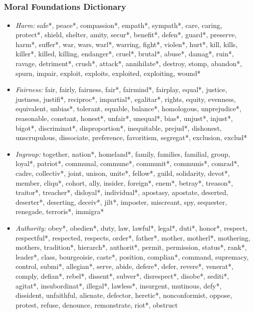 \documentclass{beamer}
\begin{document}
\subsection{}
\begin{frame}%
  \frametitle{Moral Foundations Dictionary \citep[c.f.][]{graham2009liberals}}
  \begin{tiny}
    \begin{itemize}
      \item \emph{Harm:} safe*, peace*, compassion*, empath*, sympath*, care, caring, protect*, shield, shelter, amity, secur*, benefit*, defen*, guard*, preserve, harm*, suffer*, war, wars, warl*, warring, fight*, violen*, hurt*, kill, kills, killer*, killed, killing, endanger*, cruel*, brutal*, abuse*, damag*, ruin*, ravage, detriment*, crush*, attack*, annihilate*, destroy, stomp, abandon*, spurn, impair, exploit, exploits, exploited, exploiting, wound*

      \item \emph{Fairness:} fair, fairly, fairness, fair*, fairmind*, fairplay, equal*, justice, justness, justifi*, reciproc*, impartial*, egalitar*, rights, equity, evenness, equivalent, unbias*, tolerant, equable, balance*, homologous, unprejudice*, reasonable, constant, honest*, unfair*, unequal*, bias*, unjust*, injust*, bigot*, discriminat*, disproportion*, inequitable, prejud*, dishonest, unscrupulous, dissociate, preference, favoritism, segregat*, exclusion, exclud*

      \item \emph{Ingroup:} together, nation*, homeland*, family, families, familial, group, loyal*, patriot*, communal, commune*, communit*, communis*, comrad*, cadre, collectiv*, joint, unison, unite*, fellow*, guild, solidarity, devot*, member, cliqu*, cohort, ally, insider, foreign*, enem*, betray*, treason*, traitor*, treacher*, disloyal*, individual*, apostasy, apostate, deserted, deserter*, deserting, deceiv*, jilt*, imposter, miscreant, spy, sequester, renegade, terroris*, immigra*

      \item \emph{Authority:} obey*, obedien*, duty, law, lawful*, legal*, duti*, honor*, respect, respectful*, respected, respects, order*, father*, mother, motherl*, mothering, mothers, tradition*, hierarch*, authorit*, permit, permission, status*, rank*, leader*, class, bourgeoisie, caste*, position, complian*, command, supremacy, control, submi*, allegian*, serve, abide, defere*, defer, revere*, venerat*, comply, defian*, rebel*, dissent*, subver*, disrespect*, disobe*, sediti*, agitat*, insubordinat*, illegal*, lawless*, insurgent, mutinous, defy*, dissident, unfaithful, alienate, defector, heretic*, nonconformist, oppose, protest, refuse, denounce, remonstrate, riot*, obstruct


\end{itemize}
\end{tiny}
\end{frame}
\end{document}
